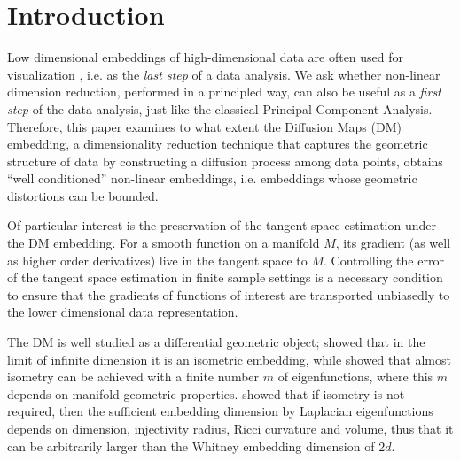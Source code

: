 \section{Introduction}
\label{nips:sec:intro}

Low dimensional embeddings of high-dimensional data are often used for visualization \cite{tsne}, i.e. as the {\em last step} of a data analysis. We ask whether non-linear dimension reduction, performed in a principled way, can also be useful as a {\em first step} of the data analysis, just like the classical Principal Component Analysis. Therefore, this paper examines to what extent the Diffusion Maps (DM) embedding\cite{COIFMAN20065,belkin2003laplacian}, a dimensionality reduction technique that captures the geometric structure of data by constructing a diffusion process among data points, obtains ``well conditioned'' non-linear embeddings, i.e. embeddings whose geometric distortions can be bounded.

Of particular interest is the preservation of the tangent space estimation under the DM embedding. For a smooth function on a manifold $M$, its gradient (as well as higher order derivatives) live in the tangent space to $M$. Controlling the error of the tangent space estimation in finite sample settings is a necessary condition to ensure that the gradients of functions of interest are transported unbiasedly to the lower dimensional data representation.

The DM is well studied as a differential geometric object; \cite{berard1994embedding} showed that in the limit of infinite dimension it is an isometric embedding, while \cite{portegies2016embeddings} showed that almost isometry can be achieved with a finite number $m$ of eigenfunctions, where this $m$ depends on manifold geometric properties. \cite{bates2014embedding} showed that if isometry is not required, then the sufficient embedding dimension by Laplacian eigenfunctions depends on dimension, injectivity radius, Ricci curvature and volume, thus that it can be arbitrarily larger than the Whitney embedding dimension of $2d$.

